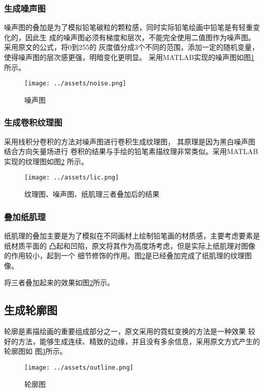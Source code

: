 \documentclass[UTF8, twocolumn]{ctexart}
\begin{document}
      \subsubsection{生成噪声图}
        噪声图的叠加是为了模拟铅笔碳粒的颗粒感，同时实际铅笔绘画中铅笔是有轻重变化的，因此生
        成的噪声图必须有梯度和层次，不能完全使用二值图作为噪声图。采用原文的公式，将0到255的
        灰度值分成3个不同的范围，添加一定的随机变量，使得噪声图的层次感更强，明暗变化更明显。
        采用MATLAB实现的噪声图如图\ref{fig:noise}所示。
        \begin{figure}[htbp]
          \begin{center}
            \texttt{[image: ../assets/noise.png]}
            \caption{噪声图}
            \label{fig:noise}
          \end{center}
        \end{figure}
      \subsubsection{生成卷积纹理图}
        采用线积分卷积\cite{lic}的方法对噪声图进行卷积生成纹理图，
        其原理是因为黑白噪声图结合方向矢量场进行
        卷积的结果与手绘的铅笔素描纹理非常类似。采用MATLAB实现的纹理图如图\ref{fig:lic}
        所示。
        \begin{figure}[htbp]
          \begin{center}
            \texttt{[image: ../assets/lic.png]}
            \caption{纹理图、噪声图、纸肌理三者叠加后的结果}
            \label{fig:lic}
          \end{center}
        \end{figure}
      \subsubsection{叠加纸肌理}
        纸肌理的叠加主要是为了模拟在不同画材上绘制铅笔画的材质感，主要考虑要素是纸材质平面的
        凸起和凹陷，原文将其作为高度场考虑，但是实际上纸肌理对图像的作用较小，起到一个
        细节修饰的作用。图\ref{fig:lic}是已经叠加完成了纸肌理的纹理图像。
        \par
        将三者叠加起来的效果如图\ref{fig:lic}所示。

    \subsection{生成轮廓图}
      轮廓是素描绘画的重要组成部分之一，原文采用的霓虹变换\cite{outline}的方法是一种效果
      较好的方法，能够生成连续、精致的边缘，并且没有多余信息，采用原文方式产生的轮廓图如
      图\ref{fig:outline}所示。
      \begin{figure}[htbp]
        \begin{center}
          \texttt{[image: ../assets/outline.png]}
          \caption{轮廓图}
          \label{fig:outline}
        \end{center}
      \end{figure}
\end{document}
